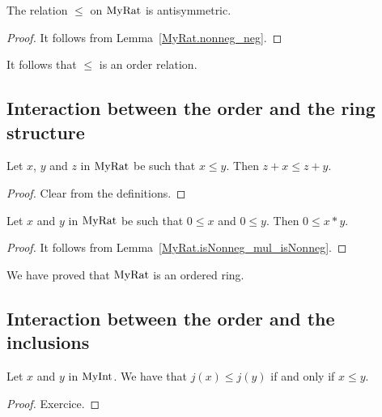 \begin{lemma}
    \label{MyRat.le_antisymm}
    \leanok
    The relation $\leq$ on $\mathrm{MyRat}$ is antisymmetric.
\end{lemma}
\begin{proof}
    \leanok
    It follows from Lemma~\ref{MyRat.nonneg_neg}.
\end{proof}

It follows that $\leq$ is an order relation.


\subsection{Interaction between the order and the ring structure}

\begin{lemma}
    \label{MyRat.add_le_add_left}
    \leanok
    Let $x$, $y$ and $z$ in $\mathrm{MyRat}$ be such that $x \leq y$. Then $z + x ≤ z + y$.
\end{lemma}
\begin{proof}
    \leanok
    Clear from the definitions.
\end{proof}

\begin{lemma}
    \label{MyRat.mul_nonneg}
    \leanok
    Let $x$ and $y$ in $\mathrm{MyRat}$ be such that $0 \leq x$ and $0 \leq y$. Then $0 \leq x * y$.
\end{lemma}
\begin{proof}
    \leanok
    It follows from Lemma~\ref{MyRat.isNonneg_mul_isNonneg}.
\end{proof}

We have proved that $\mathrm{MyRat}$ is an ordered ring.

\subsection{Interaction between the order and the inclusions}

\begin{lemma}
    \label{MyRat.j_le_iff}
    \leanok
    Let $x$ and $y$ in $\mathrm{MyInt}$. We have that $j(x) \leq j(y)$ if and only if $x \leq y$.
\end{lemma}
\begin{proof}
    \leanok
    Exercice.
\end{proof}

